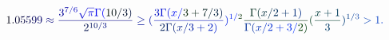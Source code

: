 \documentclass[12pt]{article}
\begin{document}
\makeatletter
\renewcommand*{\@textcolor}[3]{%
  \protect\leavevmode
  \begingroup
    \color#1{#2}#3%
  \endgroup
}
\makeatother
\begin{displaymath}
\mathcolor[RGB]{0,0,15}{1} \mathcolor[RGB]{0,0,30}{.} \mathcolor[RGB]{0,0,45}{0} \mathcolor[RGB]{0,0,60}{5} \mathcolor[RGB]{0,0,75}{5} \mathcolor[RGB]{0,0,90}{9} \mathcolor[RGB]{0,0,105}{9} \mathcolor[RGB]{0,0,120}{\approx} \mathcolor[RGB]{0,0,135}{\frac { \mathcolor[RGB]{0,0,150}{3} ^ { \mathcolor[RGB]{0,0,165}{7} \mathcolor[RGB]{0,0,180}{/} \mathcolor[RGB]{0,0,195}{6} } \mathcolor[RGB]{0,0,210}{\sqrt { \mathcolor[RGB]{0,0,225}{\pi} } } \mathcolor[RGB]{0,0,240}{\Gamma} \mathcolor[RGB]{0,0,255}{(} \mathcolor[RGB]{0,15,0}{1} \mathcolor[RGB]{0,15,15}{0} \mathcolor[RGB]{0,15,30}{/} \mathcolor[RGB]{0,15,45}{3} \mathcolor[RGB]{0,15,60}{)} } { \mathcolor[RGB]{0,15,75}{2} ^ { \mathcolor[RGB]{0,15,90}{1} \mathcolor[RGB]{0,15,105}{0} \mathcolor[RGB]{0,15,120}{/} \mathcolor[RGB]{0,15,135}{3} } } } \mathcolor[RGB]{0,15,150}{\geq} \mathcolor[RGB]{0,15,165}{(} \mathcolor[RGB]{0,15,180}{\frac { \mathcolor[RGB]{0,15,195}{3} \mathcolor[RGB]{0,15,210}{\Gamma} \mathcolor[RGB]{0,15,225}{(} \mathcolor[RGB]{0,15,240}{x} \mathcolor[RGB]{0,15,255}{/} \mathcolor[RGB]{0,30,0}{3} \mathcolor[RGB]{0,30,15}{+} \mathcolor[RGB]{0,30,30}{7} \mathcolor[RGB]{0,30,45}{/} \mathcolor[RGB]{0,30,60}{3} \mathcolor[RGB]{0,30,75}{)} } { \mathcolor[RGB]{0,30,90}{2} \mathcolor[RGB]{0,30,105}{\Gamma} \mathcolor[RGB]{0,30,120}{(} \mathcolor[RGB]{0,30,135}{x} \mathcolor[RGB]{0,30,150}{/} \mathcolor[RGB]{0,30,165}{3} \mathcolor[RGB]{0,30,180}{+} \mathcolor[RGB]{0,30,195}{2} \mathcolor[RGB]{0,30,210}{)} } } \mathcolor[RGB]{0,30,225}{)} ^ { \mathcolor[RGB]{0,30,240}{1} \mathcolor[RGB]{0,30,255}{/} \mathcolor[RGB]{0,45,0}{2} } \mathcolor[RGB]{0,45,15}{\frac { \mathcolor[RGB]{0,45,30}{\Gamma} \mathcolor[RGB]{0,45,45}{(} \mathcolor[RGB]{0,45,60}{x} \mathcolor[RGB]{0,45,75}{/} \mathcolor[RGB]{0,45,90}{2} \mathcolor[RGB]{0,45,105}{+} \mathcolor[RGB]{0,45,120}{1} \mathcolor[RGB]{0,45,135}{)} } { \mathcolor[RGB]{0,45,150}{\Gamma} \mathcolor[RGB]{0,45,165}{(} \mathcolor[RGB]{0,45,180}{x} \mathcolor[RGB]{0,45,195}{/} \mathcolor[RGB]{0,45,210}{2} \mathcolor[RGB]{0,45,225}{+} \mathcolor[RGB]{0,45,240}{3} \mathcolor[RGB]{0,45,255}{/} \mathcolor[RGB]{0,60,0}{2} \mathcolor[RGB]{0,60,15}{)} } } \mathcolor[RGB]{0,60,30}{(} \mathcolor[RGB]{0,60,45}{\frac { \mathcolor[RGB]{0,60,60}{x} \mathcolor[RGB]{0,60,75}{+} \mathcolor[RGB]{0,60,90}{1} } { \mathcolor[RGB]{0,60,105}{3} } } \mathcolor[RGB]{0,60,120}{)} ^ { \mathcolor[RGB]{0,60,135}{1} \mathcolor[RGB]{0,60,150}{/} \mathcolor[RGB]{0,60,165}{3} } \mathcolor[RGB]{0,60,180}{>} \mathcolor[RGB]{0,60,195}{1} \mathcolor[RGB]{0,60,210}{.}
\end{displaymath}
\end{document}
